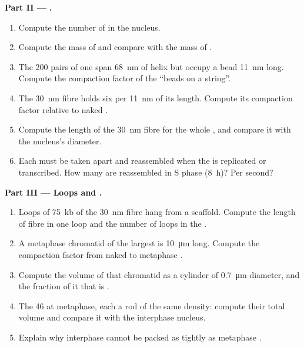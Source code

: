 \begin{problem}
\medskip
\noindent\textbf{Part II --- .}
\begin{enumerate}[resume]
  \item Compute the number of  in the nucleus.
  \item Compute the mass of  and compare with the mass of
        .
  \item The \qty{200}{} pairs of one  span \qty{68}{nm} of
        helix but occupy a bead \qty{11}{nm} long. Compute the
        compaction factor of the ``beads on a string''.
  \item The \qty{30}{nm} fibre holds six  per \qty{11}{nm}
        of its length. Compute its compaction factor relative to naked
        .
  \item Compute the length of the \qty{30}{nm} fibre for the whole
        , and compare it with the nucleus's diameter.
  \item Each  must be taken apart and reassembled when the
         is replicated or transcribed. How many  are
        reassembled in S phase (\qty{8}{h})? Per second?
\end{enumerate}

\medskip
\noindent\textbf{Part III --- Loops and .}
\begin{enumerate}[resume]
  \item Loops of \qty{75}{kb} of the \qty{30}{nm} fibre hang from a
        scaffold. Compute the length of fibre in one loop and the
        number of loops in the .
  \item A metaphase chromatid of the largest  is
        \qty{10}{\micro m} long. Compute the compaction factor from
        naked  to metaphase .
  \item Compute the volume of that chromatid as a cylinder of
        \qty{0.7}{\micro m} diameter, and the fraction of it that is
        .
  \item The 46  at metaphase, each a rod of the same
        density: compute their total volume and compare it with the
        interphase nucleus.
  \item Explain why interphase  cannot be packed as tightly
        as metaphase .
\end{enumerate}


\end{problem}
